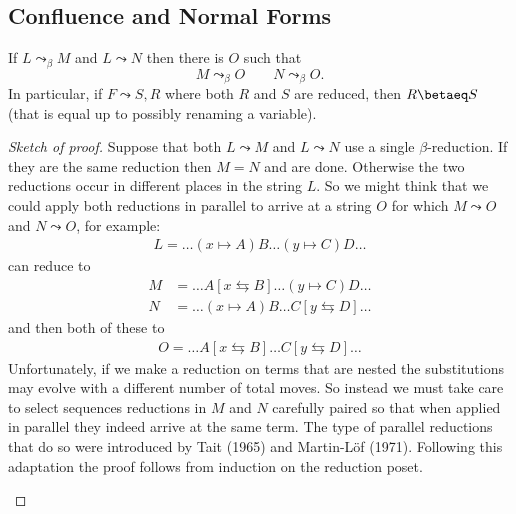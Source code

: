 \subsection{Confluence and Normal Forms}
\begin{theorem}
    If $L\leadsto_{\beta} M$ and $L\leadsto N$ then there is $O$ such that 
    \[M\leadsto_{\beta} O\qquad N\leadsto_{\beta} O.\] 
    In particular, if $F\leadsto S,R$ where both $R$ and $S$ are reduced,
    then $R\betaeq S$ (that is equal up to possibly renaming a variable).
\end{theorem}
\begin{proof}[Sketch of proof]
Suppose that both $L\leadsto M$ and $L\leadsto N$ use a single $\beta$-reduction.
If they are the same reduction then $M=N$ and are done.  Otherwise 
the two reductions occur in different places in the string $L$.  So we might 
think that we could apply both reductions in parallel to arrive at a string $O$
for which $M\leadsto O$ and $N\leadsto O$, for example:
\begin{align*}
    L = \ldots (x\mapsto A)B\ldots (y\mapsto C)D\ldots 
\end{align*}
can reduce to 
\begin{align*}
    M & = \ldots A[x\leftrightarrows B]\ldots (y\mapsto C)D\ldots \\
    N & =  \ldots (x\mapsto A)B\ldots C[y\leftrightarrows D]\ldots 
\end{align*}
and then both of these to 
\begin{align*}
O =  \ldots A[x\leftrightarrows B]\ldots C[y\leftrightarrows D]\ldots 
\end{align*}
Unfortunately, if we make a reduction on terms that are nested 
the substitutions may evolve with a different number of total moves.
So instead we must take care to select sequences reductions in $M$ and $N$ carefully 
paired so that when applied in parallel they indeed arrive at the same term.  
The type of parallel reductions that do so were introduced by Tait (1965) and
Martin-L\"of (1971). Following this adaptation the proof follows from induction
on the reduction poset.
\begin{center}
\end{center}
\end{proof}
